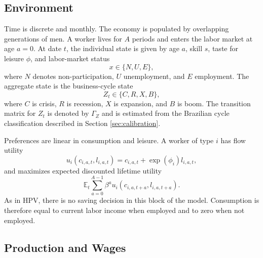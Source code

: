\documentclass[12pt]{article}
\begin{document}
	\subsection{Environment}
	
	Time is discrete and monthly. The economy is populated by overlapping generations of men. A worker lives for $A$ periods and enters the labor market at age $a=0$. At date $t$, the individual state is given by age $a$, skill $s$, taste for leisure $\phi$, and labor-market status
	\[
		x \in \{N,U,E\},
	\]
	where $N$ denotes non-participation, $U$ unemployment, and $E$ employment. The aggregate state is the business-cycle state
	\[
		Z_t \in \{C,R,X,B\},
	\]
	where $C$ is crisis, $R$ is recession, $X$ is expansion, and $B$ is boom. The transition matrix for $Z_t$ is denoted by $\Gamma_Z$ and is estimated from the Brazilian cycle classification described in Section \ref{sec:calibration}.
	
	Preferences are linear in consumption and leisure. A worker of type $i$ has flow utility
	\begin{equation}
		u_i(c_{i,a,t},l_{i,a,t})=c_{i,a,t}+\exp(\phi_i)l_{i,a,t},
	\end{equation}
	and maximizes expected discounted lifetime utility
	\begin{equation}
		\mathbb{E}_t \sum_{a=0}^{A-1}\beta^a u_i(c_{i,a,t+a},l_{i,a,t+a}).
	\end{equation}
	As in HPV, there is no saving decision in this block of the model. Consumption is therefore equal to current labor income when employed and to zero when not employed.
	
	\subsection{Production and Wages}
	
\end{document}
